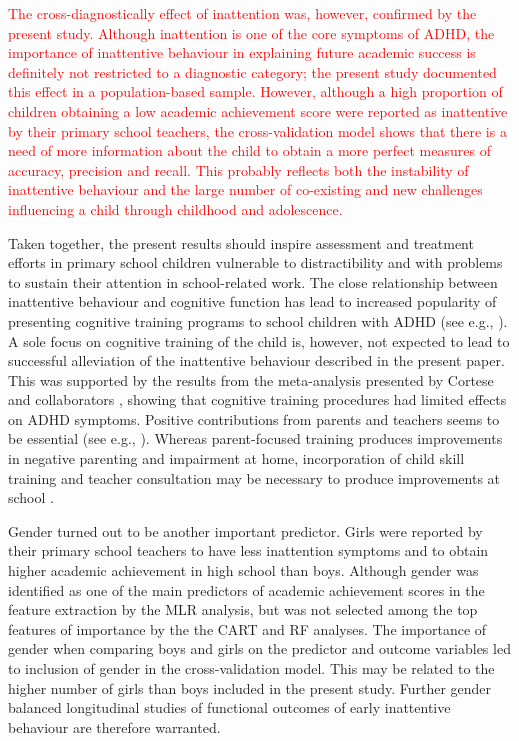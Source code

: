 \documentclass[10pt,letterpaper]{article}
\begin{document}
{{\textcolor{red}{The cross-diagnostically effect of inattention was, however, confirmed by the present study. Although  inattention is one of the core symptoms of ADHD,  the importance of inattentive behaviour in explaining future academic success is definitely not restricted to a diagnostic category; the present study documented this effect in a population-based sample.  However, although a high proportion of children obtaining a low academic achievement score were reported as inattentive by their primary school teachers, the cross-validation model shows that there is a need of more information about the child to obtain a more perfect measures of accuracy, precision and recall.  This probably reflects both the instability of inattentive behaviour and the large number of co-existing and new challenges influencing a child through childhood and adolescence. }

Taken together, the present results should inspire assessment and treatment efforts in primary school children vulnerable to distractibility and with problems to sustain their attention in school-related work. 
The close relationship between inattentive behaviour and cognitive function \cite{Berger2013, Berger2015} has lead to increased popularity of presenting cognitive training programs to school children with ADHD (see e.g., \cite{Rapport2013, Tamm2017}). A sole focus on cognitive training of the child is, however, not expected to lead to successful alleviation of the inattentive behaviour described in the present paper. This was supported by the results from the meta-analysis presented by Cortese and collaborators  \cite{Cortese2015}, showing that cognitive training procedures had limited effects on ADHD symptoms. Positive contributions from parents and teachers seems to be essential (see e.g., \cite{Pfiffner2014}). Whereas parent-focused training produces improvements in negative parenting and impairment at home, incorporation of child skill training and teacher consultation may be necessary to produce improvements at school \cite{Haack2016}. 

Gender turned out to be another important predictor. Girls were reported by their primary school teachers to have less inattention symptoms and to obtain higher academic achievement in high school than boys.  Although gender was identified as one of the main predictors of academic achievement scores in the feature extraction by the MLR analysis, but was not selected among the top features of importance by the the CART and RF analyses. The importance of gender when comparing boys and girls on the predictor and outcome variables led to inclusion of gender in the cross-validation model. This may be related to the higher number of girls than boys included in the present study.  Further gender balanced longitudinal studies of functional outcomes of early inattentive behaviour are therefore warranted. \\

}}
\end{document}
